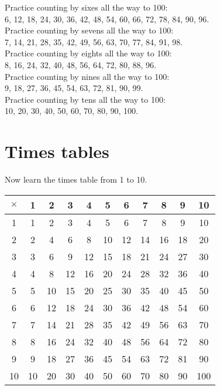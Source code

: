 \documentclass{article}
\begin{document}
\begin{spacing}{1.25}
Practice counting by sixes all the way to 100:\\
6, 12, 18, 24, 30, 36, 42, 48, 54, 60, 66, 72, 78, 84, 90, 96.\\

Practice counting by sevens all the way to 100:\\
7, 14, 21, 28, 35, 42, 49, 56, 63, 70, 77, 84, 91, 98.\\

Practice counting by eights all the way to 100:\\
8, 16, 24, 32, 40, 48, 56, 64, 72, 80, 88, 96.\\

Practice counting by nines all the way to 100:\\
9, 18, 27, 36, 45, 54, 63, 72, 81, 90, 99.\\

Practice counting by tens all the way to 100:\\
10, 20, 30, 40, 50, 60, 70, 80, 90, 100.\\

\newpage

\section*{Times tables}
Now learn the times table from 1 to 10.

\begin{center}
\begin{tabular}{|c||*{10}{c|}}
\hline
$\times$ & 1 & 2 & 3 & 4 & 5 & 6 & 7 & 8 & 9 & 10 \\
\hline\hline
1 & 1 & 2 & 3 & 4 & 5 & 6 & 7 & 8 & 9 & 10 \\
2 & 2 & 4 & 6 & 8 & 10 & 12 & 14 & 16 & 18 & 20 \\
3 & 3 & 6 & 9 & 12 & 15 & 18 & 21 & 24 & 27 & 30 \\
4 & 4 & 8 & 12 & 16 & 20 & 24 & 28 & 32 & 36 & 40 \\
5 & 5 & 10 & 15 & 20 & 25 & 30 & 35 & 40 & 45 & 50 \\
6 & 6 & 12 & 18 & 24 & 30 & 36 & 42 & 48 & 54 & 60 \\
7 & 7 & 14 & 21 & 28 & 35 & 42 & 49 & 56 & 63 & 70 \\
8 & 8 & 16 & 24 & 32 & 40 & 48 & 56 & 64 & 72 & 80 \\
9 & 9 & 18 & 27 & 36 & 45 & 54 & 63 & 72 & 81 & 90 \\
10 & 10 & 20 & 30 & 40 & 50 & 60 & 70 & 80 & 90 & 100 \\
\hline
\end{tabular}
\end{center}


\end{spacing}
\end{document}
